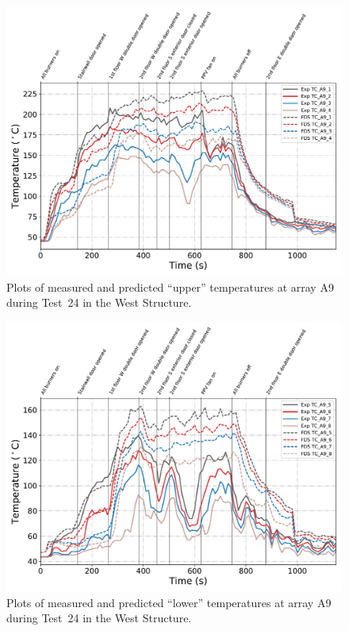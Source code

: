 \begin{figure}[!h]
	\centering
	\includegraphics[width=\columnwidth]{Figures/Plots/Validation/Temperature/Test_24_TC_A9_upper}
	\caption{Plots of measured and predicted ``upper'' temperatures at array A9 during Test~24 in the West Structure.}
	\label{fig:TCA9_upper_data_Test24}
\end{figure}
\begin{figure}[!h]
	\centering
	\includegraphics[width=\columnwidth]{Figures/Plots/Validation/Temperature/Test_24_TC_A9_lower}
	\caption{Plots of measured and predicted ``lower'' temperatures at array A9 during Test~24 in the West Structure.}
	\label{fig:TCA9_lower_data_Test24}
\end{figure}

